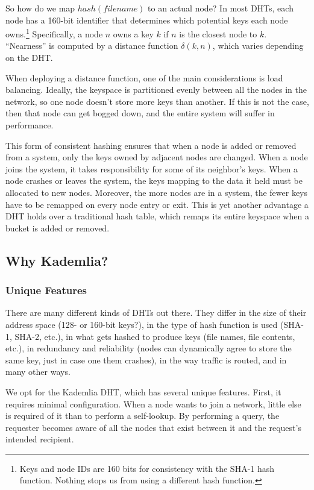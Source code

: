 \documentclass[12pt,twocolumn]{article}
\begin{document}
So how do we map $hash(filename)$ to an actual node? 
In most DHTs, each node has a 160-bit identifier that determines which potential keys each node owns.\footnote{Keys and node IDs are 160 bits for consistency with the SHA-1 hash function. Nothing stops us from using a different hash function.}
Specifically, a node $n$ owns a key $k$ if $n$ is the closest node to $k$.
``Nearness'' is computed by a distance function $\delta(k, n)$, which varies depending on the DHT.

When deploying a distance function, one of the main considerations is load balancing.
Ideally, the keyspace is partitioned evenly between all the nodes in the network, so one node doesn't store more keys than another. If this is not the case, then that node can get bogged down, and the entire system will suffer in performance.

This form of consistent hashing ensures that when a node is added or removed from a system, only the keys owned by adjacent nodes are changed. 
When a node joins the system, it takes responsibility for some of its neighbor's keys.
When a node crashes or leaves the system, the keys mapping to the data it held must be allocated to new nodes.
Moreover, the more nodes are in a system, the fewer keys have to be remapped on every node entry or exit.
This is yet another advantage a DHT holds over a traditional hash table, which remaps its entire keyspace when a bucket is added or removed.



\subsection{Why Kademlia?}

\subsubsection{Unique Features}
There are many different kinds of DHTs out there. They differ in the size of their address space (128- or 160-bit keys?), in the type of hash function is used (SHA-1, SHA-2, etc.), in what gets hashed to produce keys (file names, file contents, etc.), in redundancy and reliability (nodes can dynamically agree to store the same key, just in case one them crashes), in the way traffic is routed, and in many other ways.

We opt for the Kademlia DHT, which has several unique features.
First, it requires minimal configuration.
When a node wants to join a network, little else is required of it than to perform a self-lookup.
By performing a query, the requester becomes aware of all the nodes that exist between it and the request's intended recipient.
\end{document}
